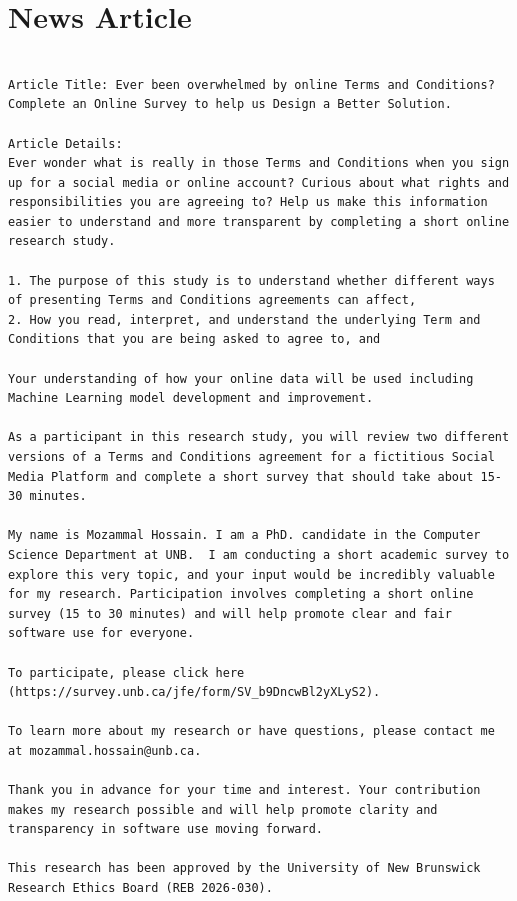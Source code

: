 \documentclass[manuscript,review,anonymous]{acmart}
\begin{document}
\section{News Article}
\begin{lstlisting}[frame=single,upquote=false,breaklines=true,columns=fullflexible,columns=fullflexible,columns=fullflexible,breakindent=0pt,basicstyle=\ttfamily\small,captionpos=b,caption=Social Media Story,label=lst:news_article]

Article Title: Ever been overwhelmed by online Terms and Conditions? Complete an Online Survey to help us Design a Better Solution.

Article Details:
Ever wonder what is really in those Terms and Conditions when you sign up for a social media or online account? Curious about what rights and responsibilities you are agreeing to? Help us make this information easier to understand and more transparent by completing a short online research study.

1. The purpose of this study is to understand whether different ways of presenting Terms and Conditions agreements can affect,
2. How you read, interpret, and understand the underlying Term and Conditions that you are being asked to agree to, and

Your understanding of how your online data will be used including Machine Learning model development and improvement.

As a participant in this research study, you will review two different versions of a Terms and Conditions agreement for a fictitious Social Media Platform and complete a short survey that should take about 15-30 minutes.

My name is Mozammal Hossain. I am a PhD. candidate in the Computer Science Department at UNB.  I am conducting a short academic survey to explore this very topic, and your input would be incredibly valuable for my research. Participation involves completing a short online survey (15 to 30 minutes) and will help promote clear and fair software use for everyone.

To participate, please click here (https://survey.unb.ca/jfe/form/SV_b9DncwBl2yXLyS2).

To learn more about my research or have questions, please contact me at mozammal.hossain@unb.ca.

Thank you in advance for your time and interest. Your contribution makes my research possible and will help promote clarity and transparency in software use moving forward.

This research has been approved by the University of New Brunswick Research Ethics Board (REB 2026-030).
\end{lstlisting}
\pagebreak
\end{document}
